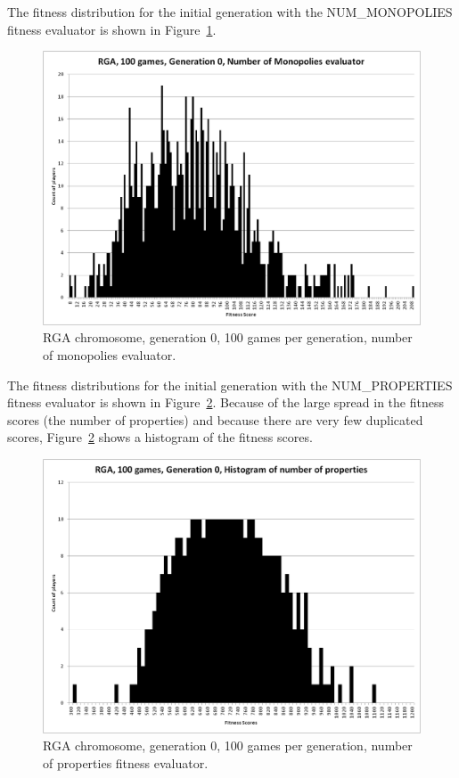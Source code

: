 The fitness distribution for the initial generation with the NUM\_MONOPOLIES
fitness evaluator is shown in
Figure~\ref{figure-RGA-G000-N100-NM-initial_fitness}.

\begin{figure}[htbp]
\centerline{\includegraphics[width=0.75\columnwidth]{Figures/RGA_1024_G000_N100_NM.png}}
\caption[RGA Fitness Distribution, Initial Generation]{RGA chromosome,
generation 0, 100 games per generation, number of monopolies evaluator.}
\label{figure-RGA-G000-N100-NM-initial_fitness}
\end{figure}

The fitness distributions for the initial generation with the NUM\_PROPERTIES
fitness evaluator is shown in
Figure~\ref{figure-RGA-G000-N100-NP-initial_fitness}. Because of the large
spread in the fitness scores (the number of properties) and because there are
very few duplicated scores, Figure~\ref{figure-RGA-G000-N100-NP-initial_fitness}
shows a histogram of the fitness scores.

\begin{figure}[htbp]
\centerline{\includegraphics[width=0.75\columnwidth]{Figures/RGA_1024_G000_N100_NP.png}}
\caption[RGA Fitness Distribution, Initial Generation]{RGA chromosome,
generation 0, 100 games per generation, number of properties fitness evaluator.}
\label{figure-RGA-G000-N100-NP-initial_fitness}
\end{figure}

